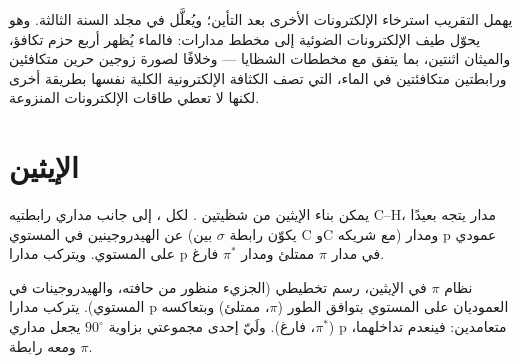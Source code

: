 \admitted

يهمل التقريب استرخاء الإلكترونات الأخرى بعد
التأين؛ ويُعلَّل في مجلد السنة الثالثة. وهو يحوّل طيف الإلكترونات الضوئية
إلى مخطط مدارات: فالماء يُظهر أربع حزم تكافؤ، والميثان اثنتين،
بما يتفق مع مخططات الشظايا --- وخلافًا لصورة زوجين حرين متكافئين
ورابطتين متكافئتين في الماء، التي تصف الكثافة الإلكترونية الكلية نفسها
بطريقة أخرى لكنها لا تعطي طاقات الإلكترونات
المنزوعة.

\section{الإيثين}

يمكن بناء الإيثين من شظيتين . لكل ، إلى جانب
مداري رابطتيه C--H، مدار يتجه بعيدًا عن الهيدروجينين في
المستوي (يكوّن رابطة $\sigma$ بين C وC مع شريكه) ومدار p
عمودي على المستوي. ويتركب مدارا p في مدار $\pi$ ممتلئ ومدار
$\pi^*$ فارغ.

\begin{omfigure}

{\small نظام $\pi$ في الإيثين، رسم تخطيطي (الجزيء منظور من حافته، 
والهيدروجينات في المستوي). يتركب مدارا p العموديان على المستوي
بتوافق الطور ($\pi$، ممتلئ) وبتعاكسه ($\pi^*$، فارغ). ولَيّ إحدى مجموعتي 
بزاوية $90^\circ$ يجعل مداري p متعامدين: فينعدم تداخلهما، ومعه
رابطة $\pi$.}
\end{omfigure}

